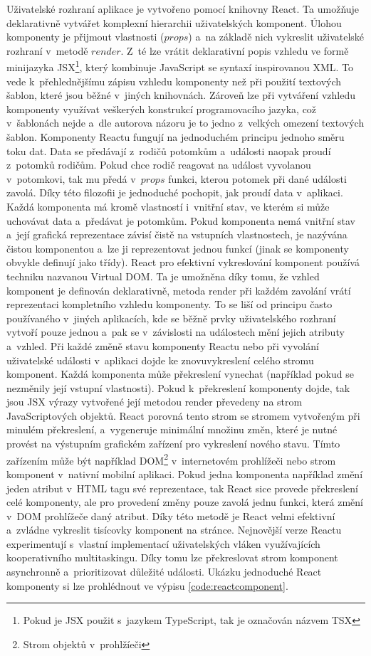 Uživatelské rozhraní aplikace je vytvořeno pomocí knihovny React. Ta umožňuje deklarativně vytvářet komplexní hierarchii uživatelských komponent. Úlohou komponenty je přijmout vlastnosti ($props$) a~na základě nich vykreslit uživatelské rozhraní v~metodě $render$. Z~té lze vrátit deklarativní popis vzhledu ve formě minijazyka JSX\footnote{Pokud je JSX použit s~jazykem TypeScript, tak je označován názvem TSX}, který kombinuje JavaScript se syntaxí inspirovanou XML. To vede k~přehlednějšímu zápisu vzhledu komponenty než při použití textových šablon, které jsou běžné v~jiných knihovnách. Zároveň lze při vytváření vzhledu komponenty využívat veškerých konstrukcí programovacího jazyka, což v~šablonách nejde a~dle autorova názoru je to jedno z~velkých omezení textových šablon. Komponenty Reactu fungují na jednoduchém principu jednoho směru toku dat. Data se předávají z~rodičů potomkům a~události naopak proudí z~potomků rodičům. Pokud chce rodič reagovat na událost vyvolanou v~potomkovi, tak mu předá v~$props$ funkci, kterou potomek při dané události zavolá. Díky této filozofii je jednoduché pochopit, jak proudí data v~aplikaci. Každá komponenta má kromě vlastností i~vnitřní stav, ve kterém si může uchovávat data a~předávat je potomkům. Pokud komponenta nemá vnitřní stav a~její grafická reprezentace závisí čistě na vstupních vlastnostech, je nazývána čistou komponentou a~lze ji reprezentovat jednou funkcí (jinak se komponenty obvykle definují jako třídy).
React pro efektivní vykreslování komponent používá techniku nazvanou Virtual DOM. Ta je umožněna díky tomu, že vzhled komponent je definován deklarativně, metoda render při každém zavolání vrátí reprezentaci kompletního vzhledu komponenty. To se liší od principu často používaného v~jiných aplikacích, kde se běžně prvky uživatelského rozhraní vytvoří pouze jednou a~pak se v~závislosti na událostech mění jejich atributy a~vzhled. Při každé změně stavu komponenty Reactu nebo při vyvolání uživatelské události v~aplikaci dojde ke znovuvykreslení celého stromu komponent. Každá komponenta může překreslení vynechat (například pokud se nezměnily její vstupní vlastnosti). Pokud k~překreslení komponenty dojde, tak jsou JSX výrazy vytvořené její metodou render převedeny na strom JavaScriptových objektů. React porovná tento strom se stromem vytvořeným při minulém překreslení, a~vygeneruje minimální množinu změn, které je nutné provést na výstupním grafickém zařízení pro vykreslení nového stavu. Tímto zařízením může být například DOM\footnote{Strom objektů v~prohlžíeči} v~internetovém prohlížeči nebo strom komponent v~nativní mobilní aplikaci. Pokud jedna komponenta například změní jeden atribut v~HTML tagu své reprezentace, tak React sice provede překreslení celé komponenty, ale pro provedení změny pouze zavolá jednu funkci, která změní v~DOM prohlížeče daný atribut.  Díky této metodě je React velmi efektivní a~zvládne vykreslit tisícovky komponent na stránce. Nejnovější verze Reactu experimentují s~vlastní implementací uživatelských vláken využívajících kooperativního multitaskingu. Díky tomu lze překreslovat strom komponent asynchronně a~prioritizovat důležité události. Ukázku jednoduché React komponenty si lze prohlédnout ve výpisu \ref{code:reactcomponent}.

